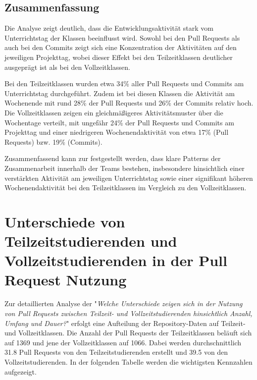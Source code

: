\subsection{Zusammenfassung}
Die Analyse zeigt deutlich, dass die Entwicklungsaktivität stark vom Unterrichtstag der Klassen beeinflusst wird. Sowohl bei den Pull Requests als auch bei den Commits zeigt sich eine Konzentration der Aktivitäten auf den jeweiligen Projekttag, wobei dieser Effekt bei den Teilzeitklassen deutlicher ausgeprägt ist als bei den Vollzeitklassen.

Bei den Teilzeitklassen wurden etwa 34\% aller Pull Requests und Commits am Unterrichtstag durchgeführt. Zudem ist bei diesen Klassen die Aktivität am Wochenende mit rund 28\% der Pull Requests und 26\% der Commits relativ hoch. Die Vollzeitklassen zeigen ein gleichmäßigeres Aktivitätsmuster über die Wochentage verteilt, mit ungefähr 24\% der Pull Requests und Commits am Projekttag und einer niedrigeren Wochenendaktivität von etwa 17\% (Pull Requests) bzw. 19\% (Commits).

Zusammenfassend kann zur  festgestellt werden, dass klare Patterns der Zusammenarbeit innerhalb der Teams bestehen, insbesondere hinsichtlich einer verstärkten Aktivität am jeweiligen Unterrichtstag sowie einer signifikant höheren Wochenendaktivität bei den Teilzeitklassen im Vergleich zu den Vollzeitklassen.
\section{Unterschiede von Teilzeitstudierenden und Vollzeitstudierenden in der Pull Request Nutzung}
Zur detaillierten Analyse der  "\textit{Welche Unterschiede zeigen sich in der Nutzung von Pull Requests zwischen Teilzeit- und Vollzeitstudierenden hinsichtlich Anzahl, Umfang und Dauer?}" erfolgt eine Aufteilung der Repository-Daten auf Teilzeit- und Vollzeitklassen. Die Anzahl der Pull Requests der Teilzeitklassen beläuft sich auf 1369 und jene der Vollzeitklassen auf 1066. Dabei werden durchschnittlich 31.8 Pull Requests von den Teilzeitstudierenden erstellt und 39.5 von den Vollzeitstudierenden. In der folgenden Tabelle werden die wichtigsten Kennzahlen aufgezeigt.

